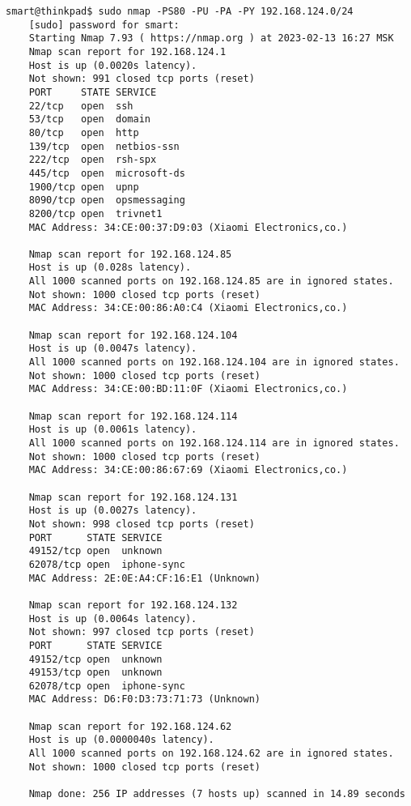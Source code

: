 \begin{Verbatim}[frame=single,breaklines=true,breakanywhere=true]
    smart@thinkpad$ sudo nmap -PS80 -PU -PA -PY 192.168.124.0/24
    [sudo] password for smart: 
    Starting Nmap 7.93 ( https://nmap.org ) at 2023-02-13 16:27 MSK
    Nmap scan report for 192.168.124.1
    Host is up (0.0020s latency).
    Not shown: 991 closed tcp ports (reset)
    PORT     STATE SERVICE
    22/tcp   open  ssh
    53/tcp   open  domain
    80/tcp   open  http
    139/tcp  open  netbios-ssn
    222/tcp  open  rsh-spx
    445/tcp  open  microsoft-ds
    1900/tcp open  upnp
    8090/tcp open  opsmessaging
    8200/tcp open  trivnet1
    MAC Address: 34:CE:00:37:D9:03 (Xiaomi Electronics,co.)

    Nmap scan report for 192.168.124.85
    Host is up (0.028s latency).
    All 1000 scanned ports on 192.168.124.85 are in ignored states.
    Not shown: 1000 closed tcp ports (reset)
    MAC Address: 34:CE:00:86:A0:C4 (Xiaomi Electronics,co.)

    Nmap scan report for 192.168.124.104
    Host is up (0.0047s latency).
    All 1000 scanned ports on 192.168.124.104 are in ignored states.
    Not shown: 1000 closed tcp ports (reset)
    MAC Address: 34:CE:00:BD:11:0F (Xiaomi Electronics,co.)

    Nmap scan report for 192.168.124.114
    Host is up (0.0061s latency).
    All 1000 scanned ports on 192.168.124.114 are in ignored states.
    Not shown: 1000 closed tcp ports (reset)
    MAC Address: 34:CE:00:86:67:69 (Xiaomi Electronics,co.)

    Nmap scan report for 192.168.124.131
    Host is up (0.0027s latency).
    Not shown: 998 closed tcp ports (reset)
    PORT      STATE SERVICE
    49152/tcp open  unknown
    62078/tcp open  iphone-sync
    MAC Address: 2E:0E:A4:CF:16:E1 (Unknown)

    Nmap scan report for 192.168.124.132
    Host is up (0.0064s latency).
    Not shown: 997 closed tcp ports (reset)
    PORT      STATE SERVICE
    49152/tcp open  unknown
    49153/tcp open  unknown
    62078/tcp open  iphone-sync
    MAC Address: D6:F0:D3:73:71:73 (Unknown)

    Nmap scan report for 192.168.124.62
    Host is up (0.0000040s latency).
    All 1000 scanned ports on 192.168.124.62 are in ignored states.
    Not shown: 1000 closed tcp ports (reset)

    Nmap done: 256 IP addresses (7 hosts up) scanned in 14.89 seconds
\end{Verbatim}

